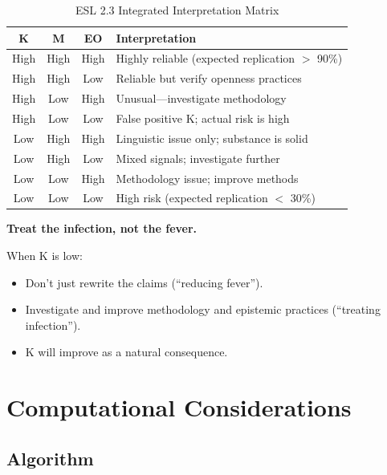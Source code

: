\documentclass[11pt,a4paper]{article}
\theoremstyle{remark}
\begin{document}
\begin{table}[h]
\centering
\caption{ESL 2.3 Integrated Interpretation Matrix}
\label{tab:integrated-matrix}
\begin{tabular}{cccl}
\toprule
\textbf{K} & \textbf{M} & \textbf{EO} & \textbf{Interpretation} \\
\midrule
High & High & High & Highly reliable (expected replication $>$ 90\%) \\
High & High & Low & Reliable but verify openness practices \\
High & Low & High & Unusual---investigate methodology \\
High & Low & Low & False positive K; actual risk is high \\
\midrule
Low & High & High & Linguistic issue only; substance is solid \\
Low & High & Low & Mixed signals; investigate further \\
Low & Low & High & Methodology issue; improve methods \\
Low & Low & Low & High risk (expected replication $<$ 30\%) \\
\bottomrule
\end{tabular}
\end{table}

\begin{keyinsight}[title={The Key Implication}]
\textbf{Treat the infection, not the fever.}

When K is low:
\begin{itemize}
    \item Don't just rewrite the claims (``reducing fever'').
    \item Investigate and improve methodology and epistemic practices (``treating infection'').
    \item K will improve as a natural consequence.
\end{itemize}
\end{keyinsight}


\section{Computational Considerations}
\label{sec:computation}

\subsection{Algorithm}
\end{document}
